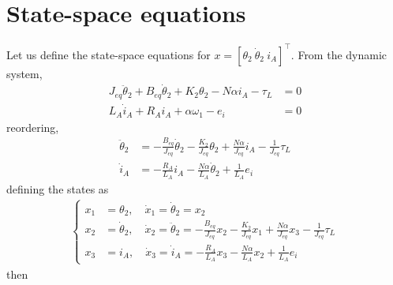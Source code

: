 \documentclass[]{article}
\begin{document}
\section{State-space equations}
Let us define the state-space equations for $x=\left[ \theta_2~\dot{\theta}_2~i_A \right]^{\intercal}$. From the dynamic system,
\begin{align*}
	J_{eq} \ddot{\theta}_2+B_{eq} \dot{\theta}_2+K_2 \theta_2-N \alpha i_A-\tau_L & = 0 \\
	L_A \dot{i}_A + R_A i_A + \alpha \omega_1 - e_i                               & = 0                              
\end{align*}
reordering,
\begin{align*}
	\ddot{\theta}_2 & = -\frac{B_{eq}}{J_{eq}} \dot{\theta}_2 - \frac{K_2}{J_{eq}} \theta_2 + \frac{N \alpha}{J_{eq}} i_A - \frac{1}{J_{eq}} \tau_L \\
	\dot{i}_A       & = -\frac{R_A}{L_A} i_A -\frac{N \alpha}{L_A} \dot{\theta}_2 + \frac{1}{L_A} e_i
\end{align*}
defining the states as
\begin{align*}
	\begin{cases}
		x_1 & = \theta_2, \quad \dot{x}_1 = \dot{\theta}_2 = x_2                                                                                                                                   \\
		x_2 & = \dot{\theta}_2, \quad \dot{x}_2  = \ddot{\theta}_2 =  -\frac{B_{eq}}{J_{eq}} x_2 - \frac{K_2}{J_{eq}} x_1 + \frac{N \alpha}{J_{eq}} x_3 - \frac{1}{J_{eq}} \tau_L \\
		x_3 & = i_A, \quad \dot{x}_3 = \dot{i}_A = -\frac{R_A}{L_A} x_3 -\frac{N \alpha}{L_A} x_2 + \frac{1}{L_A} e_i
	\end{cases}	
\end{align*}
then
\end{document}
